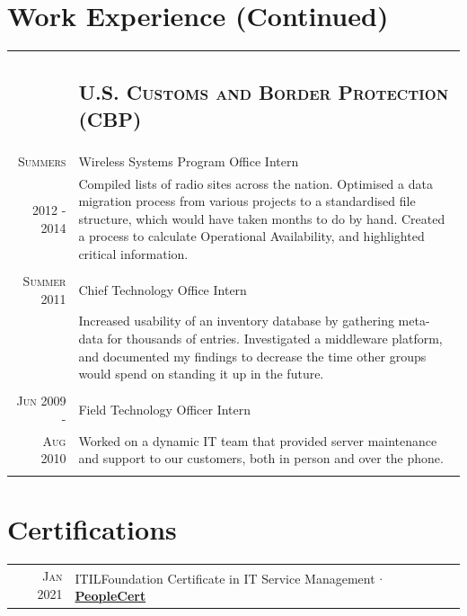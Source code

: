\documentclass[letterpaper,10pt]{article}
\begin{document}
\section{Work Experience (Continued)}
\begin{tabular}{R|B}
	                              & \subsection{\textsc{U.S. Customs and Border Protection (CBP)}}                                  \\

	\textsc{Summers}              & Wireless Systems Program Office Intern                                                          \\
	2012 - 2014                   & \footnotesize Compiled lists of radio sites across the nation. Optimised a data migration
	process from various projects to a standardised file structure, which would have taken months to do by hand. Created a process
	to calculate Operational Availability, and highlighted critical information.                                                    \\\\

	\textsc{Summer} 2011          & Chief Technology Office Intern                                                                  \\
	                              & \footnotesize Increased usability of an inventory database by gathering meta-data for thousands
	of entries. Investigated a middleware platform, and documented my findings to decrease the time
	other groups would spend on standing it up in the future.                                                                       \\\\

	\textsc{Jun} 2009 -           & Field Technology Officer Intern                                                                 \\
	\textsc{Aug} 2010\phantom{ -} & \footnotesize Worked on a dynamic IT team that provided server maintenance and support to our
	customers, both in person and over the phone.                                                                                   \\
\end{tabular}

\section{Certifications}
\begin{tabular}{R|B}
	\textsc{Jan} 2021 & \textsc{ITIL}\textsuperscript{\circledR}\phantom{ }Foundation Certificate in IT Service Management
	$\cdot$ \href{https://www.peoplecert.org/landing-pages/Successful-Candidates-Register}{\textbf{PeopleCert}}            \\
\end{tabular}
\end{document}

